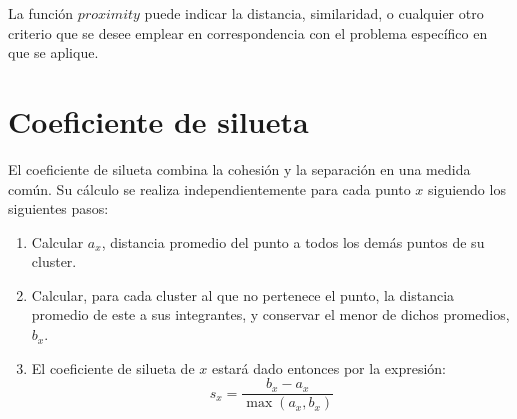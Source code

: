 La función $proximity$ puede indicar la distancia, similaridad, o cualquier otro criterio que se desee emplear en correspondencia con el problema específico en que se aplique.


\section{Coeficiente de silueta}\label{sec:coeficienteDeSilueta}

El coeficiente de silueta combina la cohesión y la separación en una medida común.
Su cálculo se realiza independientemente para cada punto $x$ siguiendo los siguientes pasos:

\begin{enumerate}
    \item Calcular $a_x$, distancia promedio del punto a todos los demás puntos de su cluster.
    \item Calcular, para cada cluster al que no pertenece el punto, la distancia promedio de este a sus integrantes, y conservar el menor de dichos promedios, $b_x$.
    \item El coeficiente de silueta de $x$ estará dado entonces por la expresión:
    \begin{equation}
        \label{eq:silhouette-coefficient}
        s_x = \frac{b_x - a_x}{\max{(a_x, b_x)}}
    \end{equation}
\end{enumerate}

